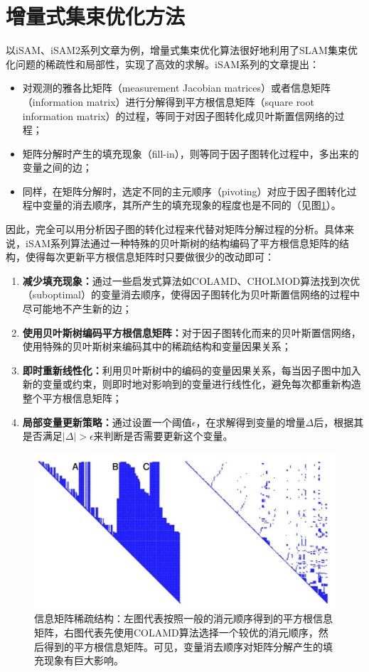 \section{增量式集束优化方法}

以iSAM\citep{kaess2008isam}、iSAM2\citep{kaess2012isam2}系列文章为例，增量式集束优化算法很好地利用了SLAM集束优化问题的稀疏性和局部性，实现了高效的求解。iSAM系列的文章提出：
\begin{itemize}
    \item 对观测的雅各比矩阵（measurement Jacobian matrices）或者信息矩阵（information matrix）进行分解得到平方根信息矩阵（square root information matrix）的过程，等同于对因子图转化成贝叶斯置信网络的过程；
    \item 矩阵分解时产生的填充现象（fill-in），则等同于因子图转化过程中，多出来的变量之间的边；
    \item 同样，在矩阵分解时，选定不同的主元顺序（pivoting）对应于因子图转化过程中变量的消去顺序，其所产生的填充现象的程度也是不同的（见图\ref{fig:fill_in}）。
\end{itemize}

因此，完全可以用分析因子图的转化过程来代替对矩阵分解过程的分析。具体来说，iSAM系列算法通过一种特殊的贝叶斯树的结构编码了平方根信息矩阵的结构，使得每次更新平方根信息矩阵时只要做很少的改动即可：
\begin{enumerate}
    \item \textbf{减少填充现象：}通过一些启发式算法如COLAMD\citep{davis2004algorithm}、CHOLMOD\citep{chen2008algorithm}算法找到次优（suboptimal）的变量消去顺序，使得因子图转化为贝叶斯置信网络的过程中尽可能地不产生新的边；
    \item \textbf{使用贝叶斯树编码平方根信息矩阵：}对于因子图转化而来的贝叶斯置信网络，使用特殊的贝叶斯树来编码其中的稀疏结构和变量因果关系；
    \item \textbf{即时重新线性化：}利用贝叶斯树中的编码的变量因果关系，每当因子图中加入新的变量或约束，则即时地对影响到的变量进行线性化，避免每次都重新构造整个平方根信息矩阵；
    \item \textbf{局部变量更新策略：}通过设置一个阈值$\epsilon$，在求解得到变量的增量$\Delta$后，根据其是否满足$|\Delta|>\epsilon$来判断是否需要更新这个变量。
\end{enumerate}

\begin{figure}[htb!]
    \centering
    \includegraphics[width=.8\textwidth]{./figs/sparse_pattern.png}
    \caption{信息矩阵稀疏结构\citep{kaess2008isam}：左图代表按照一般的消元顺序得到的平方根信息矩阵，右图代表先使用COLAMD算法选择一个较优的消元顺序，然后得到的平方根信息矩阵。可见，变量消去顺序对矩阵分解产生的填充现象有巨大影响。}
    \label{fig:fill_in}
\end{figure}
